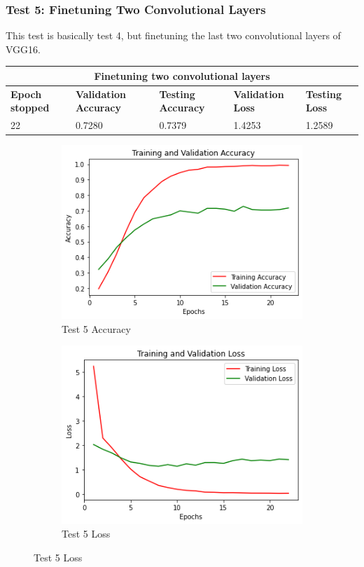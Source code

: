 \subsubsection{Test 5: Finetuning Two Convolutional Layers}
This test is basically test 4, but finetuning the last two convolutional layers of VGG16.

 \medskip

\begin{tabular}{ |p{2cm}|p{2cm}|p{2cm}|p{2cm}|p{2cm}|  }
\hline
\multicolumn{5}{|c|}{Finetuning two convolutional layers} \\
\hline
\textbf{Epoch stopped} & \textbf{Validation Accuracy} & \textbf{Testing Accuracy} & \textbf{Validation Loss} & \textbf{Testing Loss} \\
\hline
22 & 0.7280 & 0.7379 & 1.4253 & 1.2589\\
\hline
\end{tabular}

\medskip

\begin{figure}[H]
	\begin{subfigure}{0.5\textwidth}
		\includegraphics[width=0.9\linewidth]{img/vgg16/vgg16ft2dropacc.png} 
		\caption{Test 5 Accuracy}
		\label{fig:vgg16ft2dropacc}
	\end{subfigure}
	\begin{subfigure}{0.5\textwidth}
		\includegraphics[width=0.9\linewidth]{img/vgg16/vgg16ft2droploss.png}
		\caption{Test 5 Loss}
		\label{fig:vgg16ft2droploss}
	\end{subfigure}
\end{figure}


